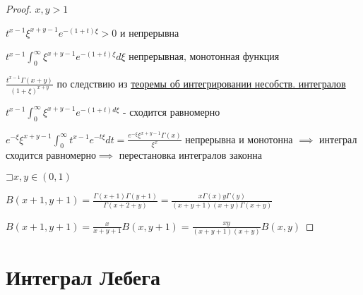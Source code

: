 \documentclass[a4paper, 12pt]{article}
\newcommand\letsymbol{\mathord{\sqsupset}}
\theoremstyle{definition}
\theoremstyle{remark}
\begin{document}
\begin{enumerate}
\begin{proof}
          $x, y > 1$

          $t^{x-1}\xi^{x+y-1}e^{-(1+t)\xi}>0$ и непрерывна

          $t^{x-1}\int_0^\infty \xi^{x+y-1}e^{-(1+t)\xi}d\xi$ непрерывная, монотонная функция
          
          $\frac{t^{x-1}\Gamma(x+y)}{(1+\xi)^{x+y}}$ по следствию из \hyperlink{p3}{теоремы об интегрировании несобств. интегралов}

          $t^{x-1}\int_0^\infty \xi^{x+y-1}e^{-(1+t)d\xi}$ - сходится равномерно

          $e^{-\xi}\xi^{x+y-1}\int_0^\infty t^{x-1}e^{-t\xi}dt = \frac{e^{-\xi}\xi^{x+y-1}\Gamma(x)}{\xi^x}$
          непрерывна и монотонна
          $\implies$ интеграл сходится равномерно$\implies$ перестановка интегралов законна

          $\letsymbol{}x, y\in (0,1)$

          $B(x+1, y+1) = \frac{\Gamma(x+1)\Gamma(y+1)}{\Gamma(x+2+y)} = \frac{x\Gamma(x)y\Gamma(y)}{(x+y+1)(x+y)\Gamma(x+y)}$

          $B(x+1, y+1) =\frac{x}{x+y+1}B(x, y+1) = \frac{xy}{(x+y+1)(x+y)}B(x, y)$


     \end{proof}
\end{enumerate}

\section{Интеграл Лебега}
\end{document}
